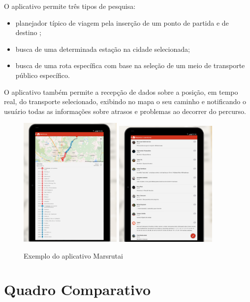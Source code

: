 O aplicativo permite três tipos de pesquisa: 

\begin{itemize}
\item planejador típico de viagem pela inserção de um ponto de partida e de destino ;
\item busca de uma determinada estação na cidade selecionada; 
\item busca de uma rota específica com base na seleção de um meio de transporte público específico. 
\end{itemize}

O aplicativo também permite a recepção de dados sobre a posição, em tempo real,  do transporte selecionado, exibindo no mapa o seu caminho e notificando o usuário todas as informações sobre atrasos e problemas ao decorrer do percurso.

\begin{figure}[htp]
\begin{center}
  \includegraphics[width=5cm]{images/Marsrutai.png}
    \includegraphics[width=5cm]{images/Marsrutai2.png}
  \caption{Exemplo do aplicativo Marsrutai}
  \label{fig:exampleMarsrutai}
\end{center}
\end{figure}

\section{Quadro Comparativo}

